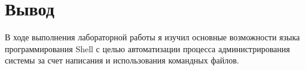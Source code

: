 \section*{Вывод}
В ходе выполнения лабораторной работы я изучил основные  возможности  языка программирования  Shell с целью автоматизации процесса администрирования системы за счет написания и использования командных файлов.